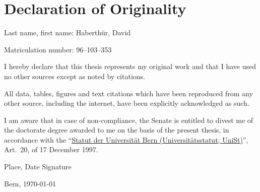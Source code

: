 \chapter*{Declaration of Originality}
\thispagestyle{empty}

Last name, first name: Haberthür, David\bigskip

\noindent Matriculation number: 96--103--353\bigskip

I hereby declare that this thesis represents my original work and that I have used no other sources except as noted by citations.

All data, tables, figures and text citations which have been reproduced from any other source, including the internet, have been explicitly acknowledged as such.

I am aware that in case of non-compliance, the Senate is entitled to divest me of the doctorate degree awarded to me on the basis of the present thesis, in accordance with the
``\href{http://www.sta.be.ch/belex/d/4/436_111_2.html}{Statut der Universität Bern (Universitätsstatut; UniSt)}'', Art.\ 20, of 17 December 1997.

\vspace{2cm}
\noindent Place, Date \hfill Signature\bigskip\bigskip

\noindent Bern, \today \hfill\dotfill